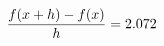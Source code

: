 \documentclass[preview]{standalone}
\begin{document}
\begin{align*}
\special{dvisvgm:raw <g id='unique000'>}\frac{f(x+h)-f(x)}{h} = 2.072\special{dvisvgm:raw </g>}
\end{align*}
\end{document}
